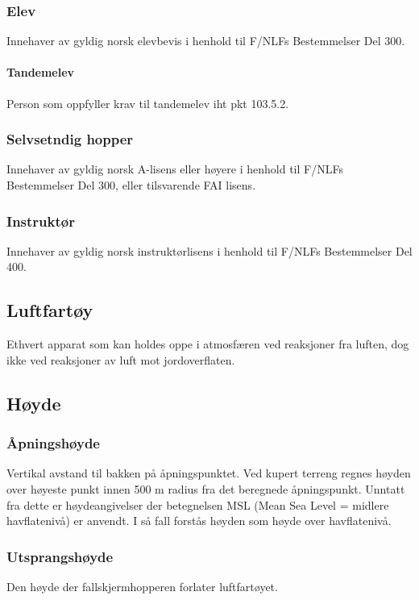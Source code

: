 \subsubsection{Elev}
Innehaver av gyldig norsk elevbevis i henhold til F/NLFs Bestemmelser Del 300.

\paragraph{Tandemelev}
Person som oppfyller krav til tandemelev iht pkt 103.5.2.

\subsubsection{Selvsetndig hopper}
Innehaver av gyldig norsk A-lisens eller høyere i henhold til F/NLFs Bestemmelser Del 300, eller tilsvarende FAI lisens.

\subsubsection{Instruktør}
Innehaver av gyldig norsk instruktørlisens i henhold til F/NLFs Bestemmelser Del 400.

\subsection{Luftfartøy}
Ethvert apparat som kan holdes oppe i atmosfæren ved reaksjoner fra luften, dog ikke ved reaksjoner av luft mot jordoverflaten.

\subsection{Høyde}
\subsubsection{Åpningshøyde}
Vertikal avstand til bakken på åpningspunktet. Ved kupert terreng regnes høyden over høyeste punkt innen 500 m radius fra det beregnede åpningspunkt. Unntatt fra dette er høydeangivelser der betegnelsen MSL (Mean Sea Level = midlere havflatenivå) er anvendt. I så fall forstås høyden som høyde over havflatenivå.

\subsubsection{Utsprangshøyde}
Den høyde der fallskjermhopperen forlater luftfartøyet.

